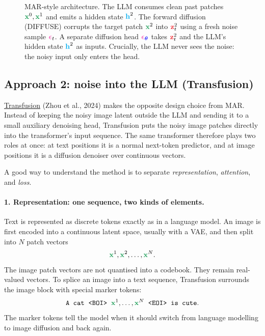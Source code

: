 \documentclass[usenames,dvipsnames]{article}
\newcommand{\myvec}[1]{\mathbf{#1}}
\newcommand{\myvecsym}[1]{\boldsymbol{#1}}
\newcommand{\vx}{\myvec{\textcolor{ForestGreen}{x}}}
\newcommand{\vz}{\myvec{\textcolor{Red}{z}}}
\newcommand{\vh}{\myvec{\textcolor{Cyan}{h}}}
\newcommand{\vtheta}{\myvecsym{\textcolor{blue}{\theta}}}
\newcommand{\vepsilon}{\myvecsym{\textcolor{CarnationPink}{\epsilon}}}
\begin{document}
\begin{figure}[h!]
\caption{MAR-style architecture. The LLM consumes clean past patches $\vx^0, \vx^1$ and emits a hidden state $\vh^2$. The forward diffusion (DIFFUSE) corrupts the target patch $\vx^2$ into $\vz^2_t$ using a fresh noise sample $\vepsilon_t$. A separate diffusion head $\vepsilon_{\vtheta}$ takes $\vz^2_t$ and the LLM's hidden state $\vh^2$ as inputs. Crucially, the LLM never sees the noise: the noisy input only enters the head.}
\label{fig:llmwithdiffusion}
\end{figure}

\subsection{Approach 2: noise into the LLM (Transfusion)}

\href{https://arxiv.org/abs/2408.11039}{Transfusion} (Zhou et al., 2024) makes the opposite design choice from MAR.  Instead of keeping the noisy image latent outside the LLM and sending it to a small auxiliary denoising head, Transfusion puts the noisy image patches directly into the transformer's input sequence.  The same transformer therefore plays two roles at once: at text positions it is a normal next-token predictor, and at image positions it is a diffusion denoiser over continuous vectors.

A good way to understand the method is to separate \emph{representation}, \emph{attention}, and \emph{loss}.

\paragraph{1. Representation: one sequence, two kinds of elements.}
Text is represented as discrete tokens exactly as in a language model.  An image is first encoded into a continuous latent space, usually with a VAE, and then split into $N$ patch vectors
\[
    \vx^1,\vx^2,\ldots,\vx^N .
\]
The image patch vectors are not quantised into a codebook.  They remain real-valued vectors.  To splice an image into a text sequence, Transfusion surrounds the image block with special marker tokens:
\[
    \texttt{A cat}\;\; \texttt{<BOI>}\;\;
    \vx^1,\ldots,\vx^N\;\; \texttt{<EOI>}\;\; \texttt{is cute}.
\]
The marker tokens tell the model when it should switch from language modelling to image diffusion and back again.
\end{document}
